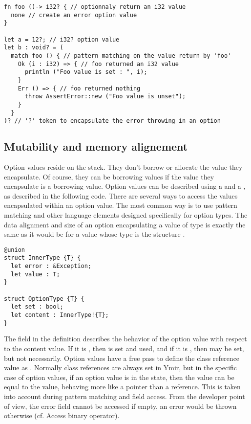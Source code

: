 \begin{lstlisting}[style=coloredverbatim]
fn foo ()-> i32? { // optionnaly return an i32 value
  none // create an error option value
}

let a = 12?; // i32? option value
let b : void? = (
  match foo () { // pattern matching on the value return by 'foo'
    Ok (i : i32) => { // foo returned an i32 value
      println ("Foo value is set : ", i);
    }
    Err () => { // foo returned nothing
      throw AssertError::new ("Foo value is unset");
    }
  }
)? // '?' token to encapsulate the error throwing in an option

\end{lstlisting}

\subsection{Mutability and memory alignement}

Option values reside on the stack. They don't borrow or allocate the value they
encapsulate. Of course, they can be borrowing values if the value they
encapsulate is a borrowing value. Option values can be described using a
 and a , as described in the following code.
There are several ways to access the values encapsulated within an option value.
The most common way is to use pattern matching and other language elements
designed specifically for option types. The data alignment and size of an option
encapsulating a value of type  is exactly the same as it would be for
a value whose type is the structure .

\begin{lstlisting}[style=coloredverbatim]
@union
struct InnerType {T} {
  let error : &Exception;
  let value : T;
}

struct OptionType {T} {
  let set : bool;
  let content : InnerType!{T};
}
\end{lstlisting}

The  field in the  definition describes the
behavior of the option value with respect to the content value. If it is
, then  is set and used, and if it is
, then  may be set, but not necessarily.
Option values have a free pass to define the class reference value
 as . Normally class references are always
set in Ymir, but in the specific case of option values, if an option value is in
the  state, then the  value can be equal to
the  value, behaving more like a pointer than a reference. This is
taken into account during pattern matching and field access. From the developer
point of view, the error field cannot be accessed if empty, an error would be
thrown otherwise (cf. Access binary operator).

